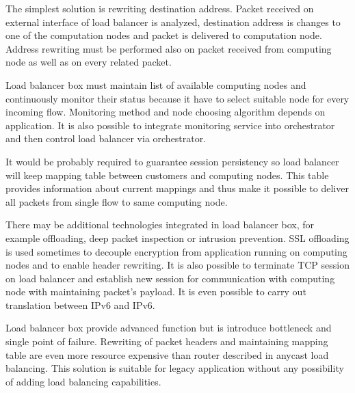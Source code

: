 The simplest solution is rewriting destination address. Packet received on external interface of load balancer is analyzed, destination address is changes to one of the computation nodes and packet is delivered to computation node. Address rewriting must be performed also on packet received from computing node as well as on every related packet. 

Load balancer box must maintain list of available computing nodes and continuously monitor their status because it have to select suitable node for every incoming flow. Monitoring method and node choosing algorithm depends on application. It is also possible to integrate monitoring service into orchestrator and then control load balancer via orchestrator.

It would be probably required to guarantee session persistency so load balancer will keep mapping table between customers and computing nodes. This table provides information about current mappings and thus make it possible to deliver all packets from single flow to same computing node.

There may be additional technologies integrated in load balancer box, for example offloading, deep packet inspection or intrusion prevention. \Ac{SSL} offloading is used sometimes to decouple encryption from application running on computing nodes and to enable header rewriting. It is also possible to terminate \Ac{TCP} session on load balancer and establish new session for communication with computing node with maintaining packet's payload. It is even possible to carry out translation between \Ac{IPv6} and \Ac{IPv6}.

Load balancer box provide advanced function but is introduce bottleneck and single point of failure. Rewriting of packet headers and maintaining mapping table are even more resource expensive than router described in anycast load balancing. This solution is suitable for legacy application without any possibility of adding load balancing capabilities. 



